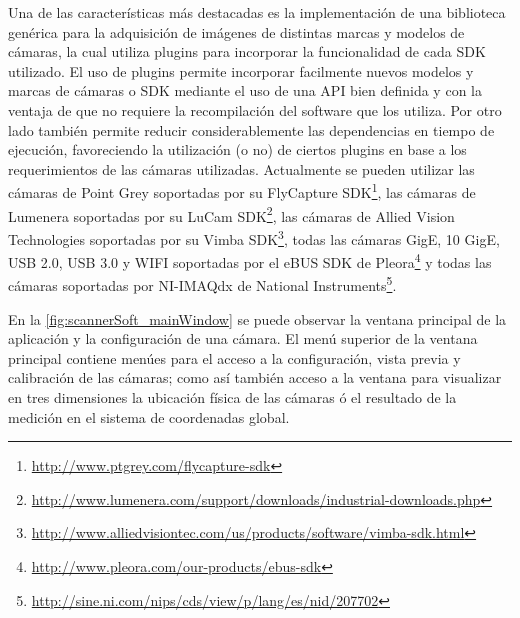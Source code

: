 Una de las características más destacadas es la implementación de una biblioteca genérica para la adquisición de imágenes de distintas marcas y modelos de cámaras, la cual utiliza plugins para incorporar la funcionalidad de cada \ac{SDK} utilizado. El uso de plugins permite incorporar facilmente nuevos modelos y marcas de cámaras o \ac{SDK} mediante el uso de una \ac{API} bien definida y con la ventaja de que no requiere la recompilación del software que los utiliza. Por otro lado también permite reducir considerablemente las dependencias en tiempo de ejecución, favoreciendo la utilización (o no) de ciertos plugins en base a los requerimientos de las cámaras utilizadas. Actualmente se pueden utilizar las cámaras de Point Grey soportadas por su FlyCapture SDK\footnote{\url{http://www.ptgrey.com/flycapture-sdk}}, las cámaras de Lumenera soportadas por su LuCam SDK\footnote{\url{http://www.lumenera.com/support/downloads/industrial-downloads.php}}, las cámaras de Allied Vision Technologies soportadas por su Vimba SDK\footnote{\url{http://www.alliedvisiontec.com/us/products/software/vimba-sdk.html}}, todas las cámaras GigE, 10 GigE, USB 2.0, USB 3.0 y WIFI soportadas por el eBUS SDK de Pleora\footnote{\url{http://www.pleora.com/our-products/ebus-sdk}} y todas las cámaras soportadas por NI-IMAQdx de National Instruments\footnote{\url{http://sine.ni.com/nips/cds/view/p/lang/es/nid/207702}}.

En la \autoref{fig:scannerSoft_mainWindow} se puede observar la ventana principal de la aplicación y la configuración de una cámara. El menú superior de la ventana principal contiene menúes para el acceso a la configuración, vista previa y calibración de las cámaras; como así también acceso a la ventana para visualizar en tres dimensiones la ubicación física de las cámaras ó el resultado de la medición en el sistema de coordenadas global.

